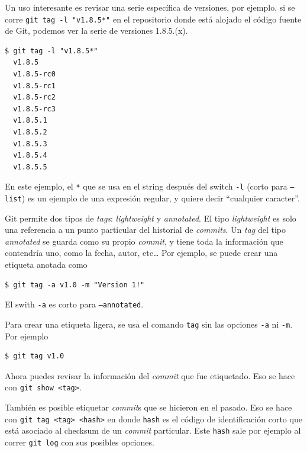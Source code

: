 \documentclass[spanish, 12pt, a4paper]{article}
\begin{document}
Un uso interesante es revisar una serie específica de versiones, por
ejemplo, si se corre \passthrough{\lstinline!git tag -l "v1.8.5*"!} en
el repositorio donde está alojado el código fuente de Git, podemos ver
la serie de versiones 1.8.5.(x).

\begin{lstlisting}
$ git tag -l "v1.8.5*"
  v1.8.5
  v1.8.5-rc0
  v1.8.5-rc1
  v1.8.5-rc2
  v1.8.5-rc3
  v1.8.5.1
  v1.8.5.2
  v1.8.5.3
  v1.8.5.4
  v1.8.5.5
\end{lstlisting}

En este ejemplo, el \passthrough{\lstinline!*!} que se usa en el string
después del switch \passthrough{\lstinline!-l!} (corto para
\passthrough{\lstinline!–list!}) es un ejemplo de una expresión regular,
y quiere decir ``cualquier caracter''.

Git permite dos tipos de \emph{tags}: \emph{lightweight} y
\emph{annotated}. El tipo \emph{lightweight} es solo una referencia a un
punto particular del historial de \emph{commits}. Un \emph{tag} del tipo
\emph{annotated} se guarda como su propio \emph{commit}, y tiene toda la
información que contendría uno, como la fecha, autor, etc\ldots{} Por
ejemplo, se puede crear una etiqueta anotada como

\begin{lstlisting}
$ git tag -a v1.0 -m "Version 1!"
\end{lstlisting}

El swith \passthrough{\lstinline!-a!} es corto para
\passthrough{\lstinline!–annotated!}.

Para crear una etiqueta ligera, se usa el comando
\passthrough{\lstinline!tag!} sin las opciones
\passthrough{\lstinline!-a!} ni \passthrough{\lstinline!-m!}. Por
ejemplo

\begin{lstlisting}
$ git tag v1.0
\end{lstlisting}

Ahora puedes revisar la información del \emph{commit} que fue
etiquetado. Eso se hace con \passthrough{\lstinline!git show <tag>!}.

También es posible etiquetar \emph{commit}s que se hicieron en el
pasado. Eso se hace con \passthrough{\lstinline!git tag <tag> <hash>!}
en donde \passthrough{\lstinline!hash!} es el código de identificación
corto que está asociado al checksum de un \emph{commit} particular. Este
\passthrough{\lstinline!hash!} sale por ejemplo al correr
\passthrough{\lstinline!git log!} con sus posibles opciones.
\end{document}
